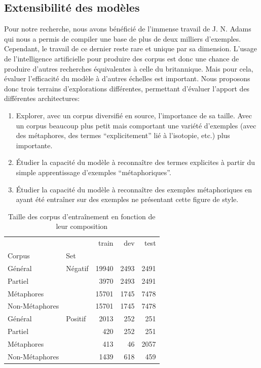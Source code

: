 \subsection{Extensibilité des modèles}

Pour notre recherche, nous avons bénéficié de l'immense travail de J. N. Adams qui nous a permis de compiler une base de plus de deux milliers d'exemples. Cependant, le travail de ce dernier reste rare et unique par sa dimension. L'usage de l'intelligence artificielle pour produire des corpus est donc une chance de produire d'autres recherches équivalentes à celle du britannique. Mais pour cela, évaluer l'efficacité du modèle à d'autres échelles est important. Nous proposons donc trois terrains d'explorations différentes, permettant d'évaluer l'apport des différentes architectures:

\begin{enumerate}
    \item Explorer, avec un corpus diversifié en source, l'importance de sa taille. Avec un corpus beaucoup plus petit mais comportant une variété d'exemples (avec des métaphores, des termes \enquote{explicitement} lié à l'isotopie, etc.) plus importante.
    \item Étudier la capacité du modèle à reconnaître des termes explicites à partir du simple apprentissage d'exemples \enquote{métaphoriques}.
    \item Étudier la capacité du modèle à reconnaître des exemples métaphoriques en ayant été entraîner sur des exemples ne présentant cette figure de style.
\end{enumerate}

\begin{table}[]
    \centering
    \begin{tabular}{ll|rrr}
    \toprule
            &         &  train &   dev &  test \\
    Corpus & Set &        &       &       \\
    \midrule
    Général & Négatif &  19940 &  2493 &  2491 \\
    Partiel &  &   3970 &  2493 &  2491 \\
    Métaphores &  &  15701 &  1745 &  7478 \\
    Non-Métaphores &  &  15701 &  1745 &  7478 \\ \midrule
    Général & Positif &   2013 &   252 &   251 \\
    Partiel &  &    420 &   252 &   251 \\
    Métaphores &  &    413 &    46 &  2057 \\
    Non-Métaphores &  &   1439 &   618 &   459 \\
    \bottomrule
    \end{tabular}
    \caption{Taille des corpus d'entraînement en fonction de leur composition}
    \label{tab:chap4:dataset-sizes}
\end{table}

